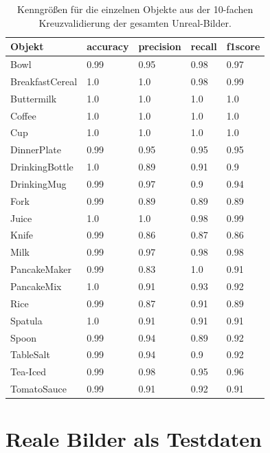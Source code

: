 \begin{table}
\begin{tabularx}{\textwidth}{Xllll}
\textbf{Objekt}	& \textbf{\gls{accuracy}} & \textbf{\gls{precision}}	& \textbf{\gls{recall}}	& \textbf{\gls{f1score}} \\ \hline
Bowl & 0.99 & 0.95 & 0.98 & 0.97 \\  
BreakfastCereal & 1.0 & 1.0 & 0.98 & 0.99 \\  
Buttermilk & 1.0 & 1.0 & 1.0 & 1.0 \\  
Coffee & 1.0 & 1.0 & 1.0 & 1.0 \\  
Cup & 1.0 & 1.0 & 1.0 & 1.0 \\  
DinnerPlate & 0.99 & 0.95 & 0.95 & 0.95 \\  
DrinkingBottle & 1.0 & 0.89 & 0.91 & 0.9 \\  
DrinkingMug & 0.99 & 0.97 & 0.9 & 0.94 \\  
Fork & 0.99 & 0.89 & 0.89 & 0.89 \\  
Juice & 1.0 & 1.0 & 0.98 & 0.99 \\  
Knife & 0.99 & 0.86 & 0.87 & 0.86 \\  
Milk & 0.99 & 0.97 & 0.98 & 0.98 \\  
PancakeMaker & 0.99 & 0.83 & 1.0 & 0.91 \\  
PancakeMix & 1.0 & 0.91 & 0.93 & 0.92 \\  
Rice & 0.99 & 0.87 & 0.91 & 0.89 \\  
Spatula & 1.0 & 0.91 & 0.91 & 0.91 \\  
Spoon & 0.99 & 0.94 & 0.89 & 0.92 \\  
TableSalt & 0.99 & 0.94 & 0.9 & 0.92 \\  
Tea-Iced & 0.99 & 0.98 & 0.95 & 0.96 \\  
TomatoSauce & 0.99 & 0.91 & 0.92 & 0.91 \\  
\end{tabularx}
\caption[Objekt-spezifische Kenngrößen des gesamten Unreal-Bilder Datensatzes]{Kenngrößen für die einzelnen Objekte aus der 10-fachen Kreuzvalidierung der gesamten Unreal-Bilder.}
\label{tab:unreal_1_classMetrics}
\end{table}


\section{Reale Bilder als Testdaten}

